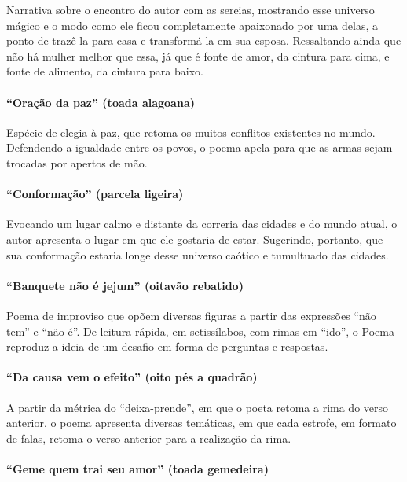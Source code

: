 Narrativa sobre o encontro do autor com as sereias, mostrando esse
universo mágico e o modo como ele ficou completamente apaixonado por
uma delas, a ponto de trazê-la para casa e transformá-la em sua esposa.
Ressaltando ainda que não há mulher melhor que essa, já que é fonte de
amor, da cintura para cima, e fonte de alimento, da cintura para baixo.

\paragraph{``Oração da paz'' (toada alagoana)}

Espécie de elegia à paz, que retoma os muitos conflitos existentes no
mundo. Defendendo a igualdade entre os povos, o poema apela para que as
armas sejam trocadas por apertos de mão.

\paragraph{``Conformação'' (parcela ligeira)}

Evocando um lugar calmo e distante da correria das cidades e do mundo
atual, o autor apresenta o lugar em que ele gostaria de estar.
Sugerindo, portanto, que sua conformação estaria longe desse universo
caótico e tumultuado das cidades.

\paragraph{``Banquete não é jejum'' (oitavão rebatido)}

Poema de improviso que opõem diversas figuras a partir das expressões
``não tem'' e ``não é''. De leitura rápida, em
setissílabos, com rimas em ``ido'', o Poema reproduz 
a ideia de um desafio em forma de perguntas e respostas.

\paragraph{``Da causa vem o efeito'' (oito pés a quadrão)}

A partir da métrica do ``deixa-prende'', em que o poeta
retoma a rima do verso anterior, o poema apresenta diversas temáticas,
em que cada estrofe, em formato de falas, retoma o verso anterior para a
realização da rima.

\paragraph{``Geme quem trai seu amor'' (toada gemedeira)}


